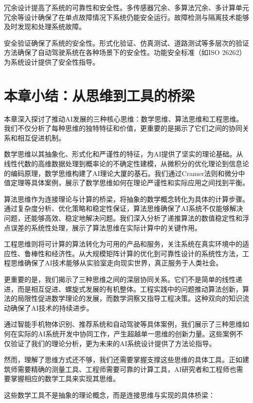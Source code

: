 冗余设计提高了系统的可靠性和安全性。多传感器冗余、多算法冗余、多计算单元冗余等设计确保了在单点故障情况下系统仍能安全运行。故障检测与隔离技术能够及时发现和处理系统故障。

安全验证确保了系统的安全性。形式化验证、仿真测试、道路测试等多层次的验证方法确保了自动驾驶系统在各种场景下的安全性。功能安全标准（如ISO 26262）为系统设计提供了安全性指导。


\section{本章小结：从思维到工具的桥梁}

本章深入探讨了推动AI发展的三种核心思维：数学思维、算法思维和工程思维。我们不仅分析了每种思维的独特特征和价值，更重要的是揭示了它们之间的协同关系和相互促进机制。

数学思维以其抽象化、形式化和严谨性的特征，为AI提供了坚实的理论基础。从线性代数的高维数据处理到概率论的不确定性建模，从微积分的优化理论到信息论的编码原理，数学思维构建了AI理论大厦的基石。我们通过Cramer法则和微分中值定理等具体案例，展示了数学思维如何在理论严谨性和实际应用之间找到平衡。

算法思维作为连接理论与计算的桥梁，将抽象的数学概念转化为具体的计算步骤。通过复杂度分析、优化策略和稳定性保证，算法思维确保了AI系统不仅能够解决问题，还能够高效、稳定地解决问题。我们深入分析了递推算法的数值稳定性和浮点误差的系统性处理，展示了算法思维在实际计算中的关键作用。

工程思维则将可计算的算法转化为可用的产品和服务，关注系统在真实环境中的适应性、鲁棒性和经济性。从大规模矩阵计算的优化到可靠性设计的系统性方法，工程思维确保了AI技术能够从实验室走向现实世界，真正服务于人类社会。

更重要的是，我们揭示了三种思维之间的深层协同关系。它们不是简单的线性递进，而是相互促进、螺旋式发展的有机整体。工程实践中的问题推动算法创新，算法的局限性促进数学理论的发展，而数学洞察又指导工程决策。这种双向的知识流动确保了AI技术的持续进步。

通过智能手机物体识别、推荐系统和自动驾驶等具体案例，我们展示了三种思维如何在实际的AI系统开发中协同工作，产生超越单一思维的创新力量。这些案例不仅验证了我们的理论分析，更为未来的AI系统设计提供了方法论指导。

然而，理解了思维方式还不够，我们还需要掌握支撑这些思维的具体工具。正如建筑师需要精确的测量工具、工程师需要可靠的计算工具，AI研究者和工程师也需要掌握相应的数学工具来实现其思维。

这些数学工具不是抽象的理论概念，而是连接思维与实现的具体桥梁：

